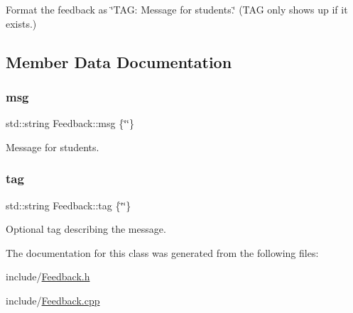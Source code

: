 Format the feedback as \char`\"{}\+T\+A\+G\+: Message for students.\char`\"{} (T\+AG only shows up if it exists.) 

\subsection{Member Data Documentation}
\hypertarget{class_feedback_a0efc7aed727a0c74948551edfe91c36b}{}\label{class_feedback_a0efc7aed727a0c74948551edfe91c36b} 
\subsubsection{\texorpdfstring{msg}{msg}}
{\footnotesize\ttfamily std\+::string Feedback\+::msg \{\char`\"{}\char`\"{}\}}

Message for students. \hypertarget{class_feedback_ae28edf8cd337af9d9de4148ce31a8c44}{}\label{class_feedback_ae28edf8cd337af9d9de4148ce31a8c44} 
\subsubsection{\texorpdfstring{tag}{tag}}
{\footnotesize\ttfamily std\+::string Feedback\+::tag \{\char`\"{}\char`\"{}\}}

Optional tag describing the message. 

The documentation for this class was generated from the following files\+:\begin{DoxyCompactItemize}
\item 
include/\hyperlink{_feedback_8h}{Feedback.\+h}\item 
include/\hyperlink{_feedback_8cpp}{Feedback.\+cpp}\end{DoxyCompactItemize}

